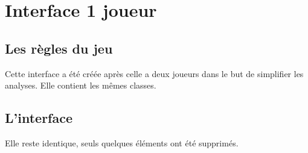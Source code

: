 \chapter{Interface 1 joueur}

\section{Les règles du jeu}
Cette interface a été créée après celle a deux joueurs dans le but de simplifier les analyses. Elle contient les mêmes classes.

\section{L'interface}
Elle reste identique, seuls quelques éléments ont été supprimés.\\





